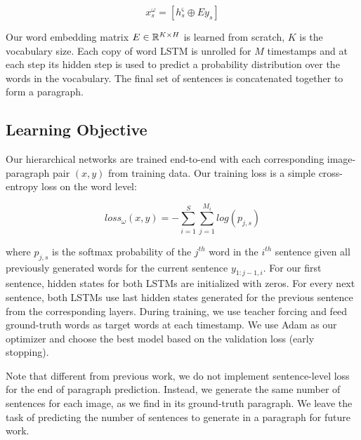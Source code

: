 \documentclass[11pt,a4paper]{article}
\newcommand{\R}{\mathbb{R}}
\begin{document}
\begin{equation}
   x^\omega_s = [h^\varsigma_s \oplus Ey_s ]
\end{equation}


Our word embedding matrix $E \in \R\sp{K \times H}$ is learned from scratch, $K$ is the vocabulary size. %
Each copy of word LSTM is unrolled for $M$ timestamps and at each step its hidden step is used to predict a probability distribution over the words in the vocabulary.
The final set of sentences is concatenated together to form a paragraph.


\subsection{Learning Objective}
Our hierarchical networks are trained end-to-end with each corresponding image-paragraph pair $(x, y)$ from training data.
Our training loss is a simple cross-entropy loss on the word level:

\begin{equation}
    loss_{\omega}(x, y) = - \sum_{i=1}^{S}\sum_{j=1}^{M_i} log(p_{j,s})
\end{equation}

where $p_{j,s}$ is the softmax probability of the $j^{th}$ word in the $i^{th}$ sentence given all previously generated words for the current sentence $y_{1:j-1,i}$.
For our first sentence, hidden states for both LSTMs are initialized with zeros.
For every next sentence, both LSTMs use last hidden states generated for the previous sentence from the corresponding layers. %
During training, we use teacher forcing and feed ground-truth words as target words at each timestamp.
We use Adam \cite{adam14} as our optimizer and choose the best model based on the validation loss (early stopping).

Note that different from previous work, we do not implement sentence-level loss for the end of paragraph prediction. %
Instead, we generate the same number of sentences for each image, as we find in its ground-truth paragraph.
We leave the task of predicting the number of sentences to generate in a paragraph for future work.
\end{document}

